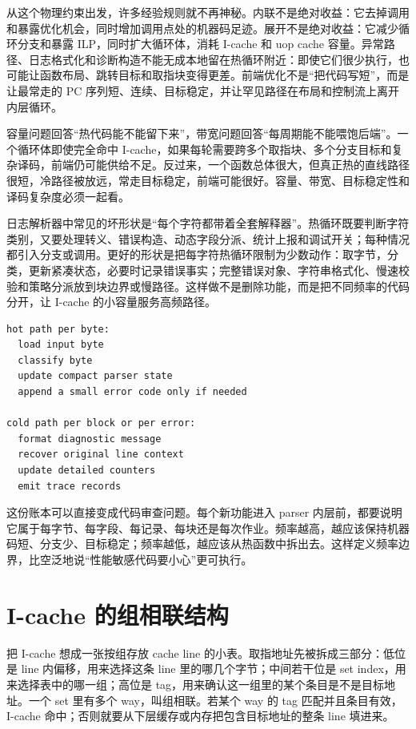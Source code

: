 从这个物理约束出发，许多经验规则就不再神秘。内联不是绝对收益：它去掉调用和暴露优化机会，同时增加调用点处的机器码足迹。展开不是绝对收益：它减少循环分支和暴露 ILP，同时扩大循环体，消耗 I-cache 和 uop cache 容量。异常路径、日志格式化和诊断构造不能无成本地留在热循环附近：即使它们很少执行，也可能让函数布局、跳转目标和取指块变得更差。前端优化不是“把代码写短”，而是让最常走的 PC 序列短、连续、目标稳定，并让罕见路径在布局和控制流上离开内层循环。

容量问题回答“热代码能不能留下来”，带宽问题回答“每周期能不能喂饱后端”。一个循环体即使完全命中 I-cache，如果每轮需要跨多个取指块、多个分支目标和复杂译码，前端仍可能供给不足。反过来，一个函数总体很大，但真正热的直线路径很短，冷路径被放远，常走目标稳定，前端可能很好。容量、带宽、目标稳定性和译码复杂度必须一起看。

日志解析器中常见的坏形状是“每个字符都带着全套解释器”。热循环既要判断字符类别，又要处理转义、错误构造、动态字段分派、统计上报和调试开关；每种情况都引入分支或调用。更好的形状是把每字符热循环限制为少数动作：取字节，分类，更新紧凑状态，必要时记录错误事实；完整错误对象、字符串格式化、慢速校验和策略分派放到块边界或慢路径。这样做不是删除功能，而是把不同频率的代码分开，让 I-cache 的小容量服务高频路径。

\begin{lstlisting}[numbers=none,caption={把热路径和冷路径分开的前端账本}]
hot path per byte:
  load input byte
  classify byte
  update compact parser state
  append a small error code only if needed

cold path per block or per error:
  format diagnostic message
  recover original line context
  update detailed counters
  emit trace records
\end{lstlisting}

这份账本可以直接变成代码审查问题。每个新功能进入 parser 内层前，都要说明它属于每字节、每字段、每记录、每块还是每次作业。频率越高，越应该保持机器码短、分支少、目标稳定；频率越低，越应该从热函数中拆出去。这样定义频率边界，比空泛地说“性能敏感代码要小心”更可执行。

\section{I-cache 的组相联结构}

把 I-cache 想成一张按组存放 cache line 的小表。取指地址先被拆成三部分：低位是 line 内偏移，用来选择这条 line 里的哪几个字节；中间若干位是 set index，用来选择表中的哪一组；高位是 tag，用来确认这一组里的某个条目是不是目标地址。一个 set 里有多个 way，叫组相联。若某个 way 的 tag 匹配并且条目有效，I-cache 命中；否则就要从下层缓存或内存把包含目标地址的整条 line 填进来。

